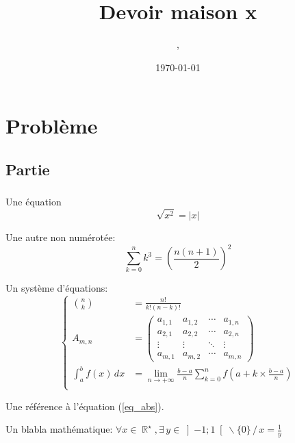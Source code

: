 \documentclass[11pt,a4paper]{article}
\author{\monNom, \maClasse}
\title{Devoir maison x}
\date{\today}
\makeatletter
\DeclareMathOperator{\RR}{\mathbb{R}}
\renewcommand{\maketitle}{
  \thispagestyle{empty}
  \begin{center}
  \shadowbox{\parbox{4in}{%
     \centering%
     \textrm{\textbf{\Large \@title}}\\
     \vspace{0.2cm}
     \textrm{\large \@author}\\
     \vspace{0.2cm}
     \textrm{\large \@date}
  }} 
  \end{center}
  \null
}
\makeatother
\begin{document}
\maketitle

\thispagestyle{fancy}

\section{Problème}

\subsection{Partie}

\subsubsection{}
Une équation
\begin{equation}
  \sqrt{x^2}=\lvert x\rvert \label{eq_abs}
\end{equation}

Une autre non numérotée:
\begin{equation*}
  \sum_{k=0}^nk^3=\left(\frac{n(n+1)}{2}\right)^2
\end{equation*}

Un système d'équations:
\begin{equation}
  \left\lbrace
  \begin{aligned}
    \binom{n}{k}      & = \frac{n!}{k!(n-k)!}                                                                       \\
    A_{m,n}           & =
    \begin{pmatrix}
      a_{1,1} & a_{1,2} & \cdots & a_{1,n} \\
      a_{2,1} & a_{2,2} & \cdots & a_{2,n} \\
      \vdots  & \vdots  & \ddots & \vdots  \\
      a_{m,1} & a_{m,2} & \cdots & a_{m,n}
    \end{pmatrix} \\
    \int_a^b f(x)\,dx & =\lim_{n\rightarrow+\infty}\frac{b-a}{n}\sum_{k=0}^{n} f\left(a+k\times\frac{b-a}{n}\right) \\
  \end{aligned}
  \right.
\end{equation}

Une référence à l'équation (\ref{eq_abs}).

Un blabla mathématique: $\forall x\in \RR^\star, \exists\, y\in \left]-1;1\right[\backslash \lbrace{0\rbrace}\, /\, x=\frac{1}{y} $
\end{document}
